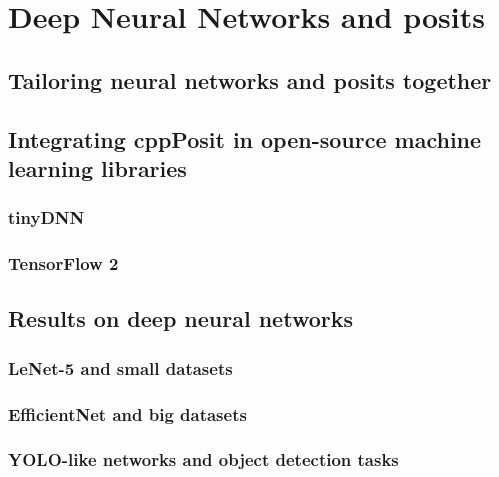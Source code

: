 
\chapter{Deep Neural Networks and posits}
\section{Tailoring neural networks and posits together}
\section{Integrating cppPosit in open-source machine learning libraries}
\subsection{tinyDNN}
\subsection{TensorFlow 2}

\section{Results on deep neural networks}
\subsection{LeNet-5 and small datasets}

\subsection{EfficientNet and big datasets}

\subsection{YOLO-like networks and object detection tasks}